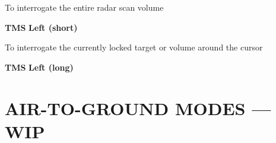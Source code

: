 \begin{checklistenumerate}
{    \smallskip
    To interrogate the entire radar scan volume

    \begin{subenumerate}
        \item \textbf{TMS} \dotfill \textbf{Left (short)}
    \end{subenumerate}

    To interrogate the currently locked target or volume around the cursor 

    \begin{subenumerate}
        \item \textbf{TMS} \dotfill \textbf{Left (long)}
    \end{subenumerate}}
\end{checklistenumerate}

\marginfigrestore

\clearpage 

\section{AIR-TO-GROUND MODES --- WIP}
\label{sec:fcr-ag}



\cleardoublepage